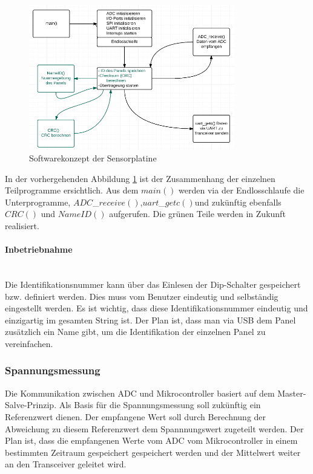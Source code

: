 \begin{figure}[htb]
\centering
\includegraphics[width=0.8\textwidth]{sections/data/Sensorplatine}
\caption{Softwarekonzept der Sensorplatine}
\label{DiagrammSP}
\end{figure}

In der vorhergehenden Abbildung \ref{DiagrammSP} ist der Zusammenhang der einzelnen Teilprogramme ersichtlich. Aus dem $main()$ werden via der Endlosschlaufe die Unterprogramme, $ADC$\_$receive()$,$uart$\_$getc()$und zukünftig ebenfalls $CRC()$ und $NameID()$ aufgerufen. Die grünen Teile werden in Zukunft realisiert.\\

\paragraph{Inbetriebnahme}\\
Die Identifikationsnummer kann über das Einlesen der Dip-Schalter gespeichert bzw. definiert werden. Dies muss vom Benutzer eindeutig und selbständig eingestellt werden. Es ist wichtig, dass diese Identifikationsnummer eindeutig und einzigartig im gesamten String ist. Der Plan ist, dass man via USB dem Panel zusätzlich ein Name gibt, um die Identifikation der einzelnen Panel zu vereinfachen. 

\subsubsection{Spannungsmessung}\label{Spannungsmessung}
Die Kommunikation zwischen ADC und Mikrocontroller basiert auf dem Master-Salve-Prinzip. 
Als Basis für die Spannungsmessung soll zukünftig ein Referenzwert dienen. Der empfangene Wert soll durch Berechnung der Abweichung zu diesem Referenzwert dem Spannnungswert zugeteilt werden. Der Plan ist, dass die empfangenen Werte vom ADC vom Mikrocontroller in einem bestimmten Zeitraum gespeichert gespeichert werden und der Mittelwert weiter an den Transceiver geleitet wird.

